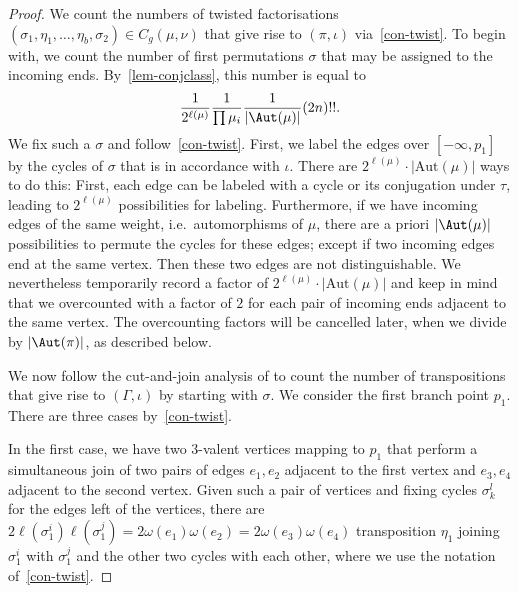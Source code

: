\begin{proof}
We count the numbers of twisted factorisations $(\sigma_1,\eta_1,\dots,\eta_b,\sigma_2)\in C_g(\mu,\nu)$ that give rise to $(\pi,\iota)$ via~\cref{con-twist}. To begin with, we count the number of first permutations $\sigma$ that may be assigned to the incoming ends. By~\cref{lem-conjclass}, this number is equal to
\begin{equation*}
    \frac{1}{2^{\ell(\mu)}} \frac{1}{\prod \mu_i} \frac{1}{|\Aut(\mu)|}(2n)!! .
\end{equation*}
We fix such a $\sigma$  and follow~\cref{con-twist}. First, we label the edges over $[-\infty,p_1]$ by the cycles of $\sigma$ that is in accordance with $\iota$. There are $2^{\ell(\mu)}\cdot |\mathrm{Aut}(\mu)|$ ways to do this: 
First, each edge can be labeled with a cycle or its conjugation under $\tau$, leading to $2^{\ell(\mu)}$ possibilities for labeling.
Furthermore, if we have incoming edges of the same weight, i.e.\ automorphisms of $\mu$, there are a priori $|\Aut(\mu)|$ possibilities to permute the cycles for these edges; except if two incoming edges end at the same vertex. Then these two edges are not distinguishable. We nevertheless temporarily record a factor of $2^{\ell(\mu)}\cdot |\mathrm{Aut}(\mu)|$ and keep in mind that we overcounted with a factor of $2$ for each pair  of incoming ends adjacent to the same vertex. The overcounting factors will be cancelled later, when we divide by $|\Aut(\pi)|$, as described below.

We now follow the cut-and-join analysis of \cite[Theorem 2.12]{BF21} to count the number of transpositions that give rise to $(\Gamma,\iota)$ by starting with $\sigma$. We consider the first branch point $p_1$. There are three cases by~\cref{con-twist}.

In the first case, we have two $3$-valent vertices mapping to $p_1$ that perform a simultaneous join of two pairs of edges $e_1,e_2$ adjacent to the first vertex and $e_3,e_4$ adjacent to the second vertex. Given such a pair of vertices and fixing cycles $\sigma_k^l$ for the edges left of the vertices, there are $2\ell(\sigma_1^i)\ell(\sigma_1^j)=2\omega(e_1)\omega(e_2)= 2\omega(e_3)\omega(e_4)$ transposition $\eta_1$ joining $\sigma_1^i$ with $\sigma_1^j$ and the other two cycles with each other, where we use the notation of~\cref{con-twist}.


\end{proof}
